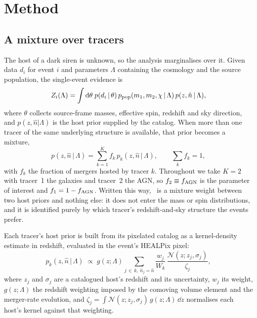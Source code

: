 \section{Method}
\label{sec:methods}

\subsection{A mixture over tracers}
\label{sec:methods:mixture}

The host of a dark siren is unknown, so the analysis marginalises over it. Given
data $d_i$ for event $i$ and parameters $\Lambda$ containing the cosmology and
the source population, the single-event evidence is
\begin{equation}
  Z_i(\Lambda) = \int \mathrm{d}\theta\; p(d_i \,|\, \theta)\,
                 p_{\rm pop}(m_1, m_2, \chi \,|\, \Lambda)\,
                 p(z, \hat{n} \,|\, \Lambda),
  \label{eq:zi}
\end{equation}
where $\theta$ collects source-frame masses, effective spin, redshift and sky
direction, and $p(z, \hat{n}|\Lambda)$ is the host prior supplied by the
catalog. When more than one tracer of the same underlying structure is
available, that prior becomes a mixture,
\begin{equation}
  p(z, \hat{n} \,|\, \Lambda) = \sum_{k=1}^{K} f_k \,
      p_k(z, \hat{n} \,|\, \Lambda), \qquad \sum_k f_k = 1,
  \label{eq:mixture}
\end{equation}
with $f_k$ the fraction of mergers hosted by tracer $k$. Throughout we take
$K=2$ with tracer~1 the galaxies and tracer~2 the AGN, so
$f_2 \equiv f_{\rm AGN}$ is the parameter of interest and $f_1 = 1 - f_{\rm AGN}$. Written
this way, \fagn\ is a mixture weight between two host priors and nothing else:
it does not enter the mass or spin distributions, and it is identified purely by
which tracer's redshift-and-sky structure the events prefer.

Each tracer's host prior is built from its pixelated catalog as a
kernel-density estimate in redshift, evaluated in the event's HEALPix pixel:
\begin{equation}
  p_k(z, \hat{n} \,|\, \Lambda) \;\propto\; g(z; \Lambda)
     \sum_{j \,\in\, k,\; \hat{n}_j = \hat{n}}
     \frac{w_j}{W_k}\,
     \frac{\mathcal{N}(z; z_j, \sigma_j)}{\zeta_j},
  \label{eq:pcat}
\end{equation}
where $z_j$ and $\sigma_j$ are a catalogued host's redshift and its
uncertainty, $w_j$ its weight, $g(z;\Lambda)$ the redshift weighting imposed by
the comoving volume element and the merger-rate evolution, and
$\zeta_j = \int \mathcal{N}(z; z_j, \sigma_j)\, g(z;\Lambda)\, \dd z$ normalises
each host's kernel against that weighting.

